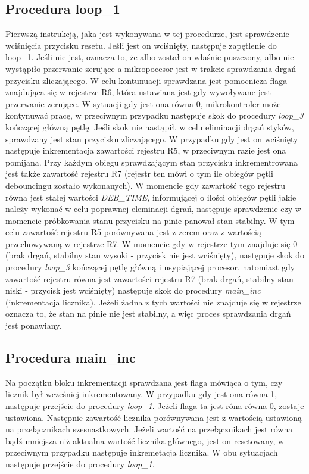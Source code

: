 \documentclass[fleqn]{article}
\begin{document}
\subsection{Procedura loop\_1}
		Pierwszą instrukcją, jaka jest wykonywana w tej procedurze, jest sprawdzenie wciśnięcia przycisku resetu. Jeśli jest on wciśnięty, następuje zapętlenie do loop\_1. Jeśli nie jest, oznacza to, że albo został on właśnie puszczony, albo nie wystąpiło przerwanie zerujące a mikropocesor jest w trakcie sprawdzania drgań przycisku zliczającego. W celu kontunuacji sprawdzana jest pomocnicza flaga znajdująca się w rejestrze R6, która ustawiana jest gdy wywoływane jest przerwanie zerujące. W sytuacji gdy jest ona równa 0, mikrokontroler może kontynuwać pracę, w przeciwnym przypadku następuje skok do procedury \textit{loop\_3} kończącej główną pętlę. Jeśli skok nie nastąpił, w celu eliminacji drgań styków, sprawdzany jest stan przycisku zliczającego. W przypadku gdy jest on wciśnięty następuje inkrementacja zawartości rejestru R5, w przeciwnym razie jest ona pomijana. Przy każdym obiegu sprawdzającym stan przycisku inkrementrowana jest także zawartość rejestru R7 (rejestr ten mówi o tym ile obiegów pętli debouncingu zostało wykonanych). W momencie gdy zawartość tego rejestru równa jest stałej wartości \textit{DEB\_TIME}, informującej o ilości obiegów pętli jakie należy wykonać w celu poprawnej eleminacji dgrań, następuje sprawdzenie czy w momencie próbkowania stanu przycisku na pinie panował stan stabilny. W tym celu zawartość rejestru R5 porównywana jest z zerem oraz z wartością przechowywaną w rejestrze R7. W momencie gdy w rejestrze tym znajduje się 0 (brak drgań, stabilny stan wysoki - przycisk nie jest wciśnięty), następuje skok do procedury \textit{loop\_3} kończącej pętlę główną i usypiającej procesor, natomiast gdy zawartość rejestru równa jest zawartości rejestru R7 (brak drgań, stabilny stan niski - przycisk jest wciśnięty) następuje skok do procedury \textit{main\_inc} (inkrementacja licznika). Jeżeli żadna z tych wartości nie znajduje się w rejestrze oznacza to, że stan na pinie nie jest stabilny, a więc proces sprawdzania drgań jest ponawiany.

\subsection{Procedura main\_inc}
		Na początku bloku inkrementacji sprawdzana jest flaga mówiąca o tym, czy licznik był wcześniej inkrementowany. W przypadku gdy jest ona równa 1, następuje przejście do procedury \textit{loop\_1}. Jeżeli flaga ta jest róna równa 0, zostaje ustawiona. Następnie zawartość licznika porównywana jest z wartością ustawioną na przełącznikach szesnastkowych. Jeżeli wartość na przełącznikach jest równa bądź mniejsza niż aktualna wartość licznika głównego, jest on resetowany, w przeciwnym przypadku następuje inkremetacja licznika. W obu sytuacjach następuje przejście do procedury \textit{loop\_1}.
\end{document}
